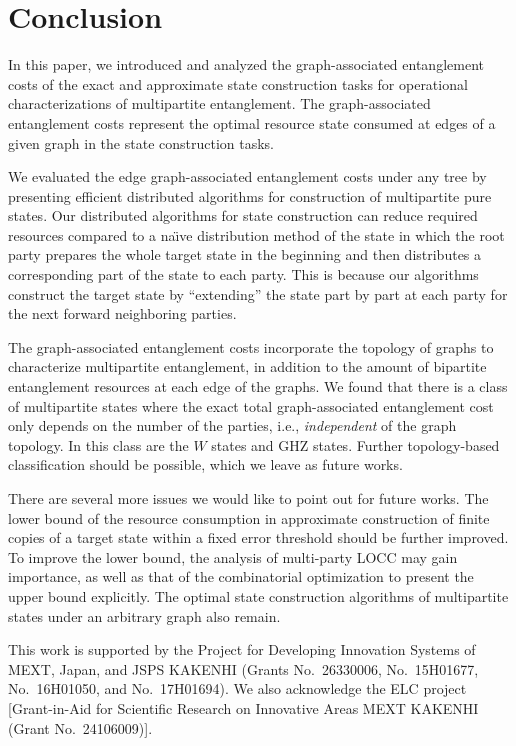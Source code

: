 \documentclass[preprintnumbers,aps,amsmath,amssymb,pra,twocolumn,showpacs,superscriptaddress,floatfix]{revtex4-1}
\theoremstyle{plain}
\theoremstyle{definition}
\theoremstyle{remark}
\begin{document}
\section{\label{sec:5}Conclusion}
In this paper, we introduced and analyzed the graph-associated entanglement costs of the exact and approximate state construction tasks for operational characterizations of multipartite entanglement.   The graph-associated entanglement costs represent the optimal resource state consumed at edges of a given graph in the state construction tasks.

We evaluated the edge graph-associated entanglement costs under any tree by presenting efficient distributed algorithms for construction of multipartite pure states.
Our distributed algorithms for state construction can reduce required resources compared to a na\"{\i}ve distribution method of the state in which the root party prepares the whole target state in the beginning and then distributes a corresponding part of the state to each party.  This is because our algorithms construct the target state by ``extending'' the state part by part at each party for the next forward neighboring parties.

The graph-associated entanglement costs incorporate the topology of graphs to characterize multipartite entanglement, in addition to the amount of bipartite entanglement resources at each edge of the graphs.  We found that there is a class of multipartite states where the exact total graph-associated entanglement cost only depends on the number of the parties, i.e., \textit{independent} of the graph topology.  In this class are the $W$ states and GHZ states.  Further topology-based classification should be possible, which we leave as future works.

There are several more issues we would like to point out for future works.   The lower bound of the resource consumption in approximate construction of finite copies of a target state within a fixed error threshold should be further improved.
To improve the lower bound, the analysis of multi-party LOCC may gain importance, as well as that of the combinatorial optimization to present the upper bound explicitly.
The optimal state construction algorithms of multipartite states under an arbitrary graph also remain.

\begin{acknowledgments}
This work is supported by the Project for Developing Innovation Systems of MEXT, Japan, and JSPS
KAKENHI (Grants No.~26330006, No.~15H01677, No.~16H01050, and No.~17H01694). We also acknowledge the ELC project [Grant-in-Aid for Scientific Research on Innovative Areas MEXT KAKENHI (Grant No.~24106009)].
\end{acknowledgments}
\end{document}
